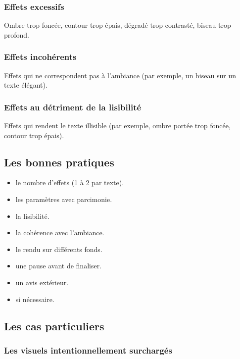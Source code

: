 \subsubsection{Effets excessifs}

Ombre trop foncée, contour trop épais, dégradé trop contrasté, biseau trop profond.

\subsubsection{Effets incohérents}

Effets qui ne correspondent pas à l'ambiance (par exemple, un biseau sur un texte élégant).

\subsubsection{Effets au détriment de la lisibilité}

Effets qui rendent le texte illisible (par exemple, ombre portée trop foncée, contour trop épais).

\subsection{Les bonnes pratiques}

\begin{itemize}
    \item {} le nombre d'effets (1 à 2 par texte).
    \item {} les paramètres avec parcimonie.
    \item {} la lisibilité.
    \item {} la cohérence avec l'ambiance.
    \item {} le rendu sur différents fonds.
    \item {} une pause avant de finaliser.
    \item {} un avis extérieur.
    \item {} si nécessaire.
\end{itemize}

\subsection{Les cas particuliers}

\subsubsection{Les visuels intentionnellement surchargés}

